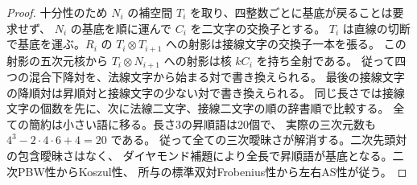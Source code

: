 \begin{proof}
十分性のため $N_i$ の補空間 $T_i$ を取り、四整数ごとに基底が戻ることは要求せず、
$N_i$ の基底を順に運んで $C_i$ を二文字の交換子とする。
$T_i$ は直線の切断で基底を運ぶ。$R_i$ の $T_i\otimes T_{i+1}$ への射影は接線文字の交換子一本を張る。
この射影の五次元核から $T_i\otimes N_{i+1}$ への射影は核 $kC_i$ を持ち全射である。
従って四つの混合下降対を、法線文字から始まる対で書き換えられる。
最後の接線文字の降順対は昇順対と接線文字の少ない対で書き換えられる。
同じ長さでは接線文字の個数を先に、次に法線二文字、接線二文字の順の辞書順で比較する。
全ての簡約は小さい語に移る。長さ3の昇順語は20個で、
実際の三次元数も $4^3-2\cdot4\cdot6+4=20$ である。
従って全ての三次曖昧さが解消する。二次先頭対の包含曖昧さはなく、
ダイヤモンド補題により全長で昇順語が基底となる。二次PBW性からKoszul性、
所与の標準双対Frobenius性から左右AS性が従う。
\end{proof}
